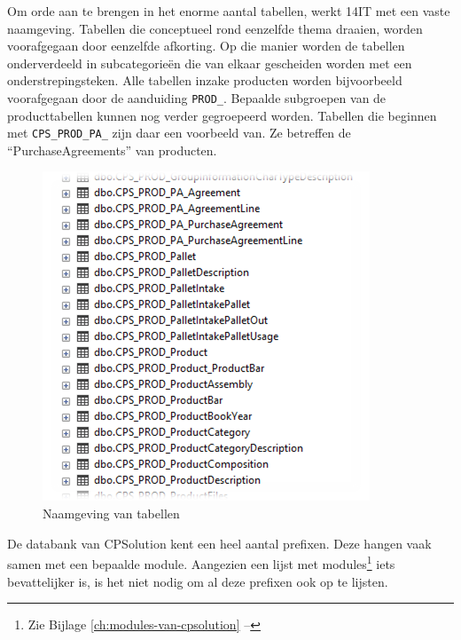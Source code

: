 Om orde aan te brengen in het enorme aantal tabellen, werkt 14IT met een vaste naamgeving.
Tabellen die conceptueel rond eenzelfde thema draaien, worden voorafgegaan door eenzelfde afkorting. Op die manier worden de tabellen onderverdeeld in subcategorieën die van elkaar gescheiden worden met een onderstrepingsteken. Alle tabellen inzake producten worden bijvoorbeeld voorafgegaan door de aanduiding \verb*|PROD_|. Bepaalde subgroepen van de producttabellen kunnen nog verder gegroepeerd worden. Tabellen die beginnen met \verb*|CPS_PROD_PA_| zijn daar een voorbeeld van. Ze betreffen de ``PurchaseAgreements'' van producten. 

\begin{figure}[H]
	\centering
	\includegraphics[width=0.45\linewidth]{img/cpsolution/naamgeving-tabellen.png}
	\caption{\label{fig:naamgeving-tabellen}Naamgeving van tabellen}
\end{figure}

De databank van CPSolution kent een heel aantal prefixen. Deze hangen vaak samen met een bepaalde module. Aangezien een lijst met modules\footnote{Zie Bijlage \ref{ch:modules-van-cpsolution} -- } iets bevattelijker is, is het niet nodig om al deze prefixen ook op te lijsten.

